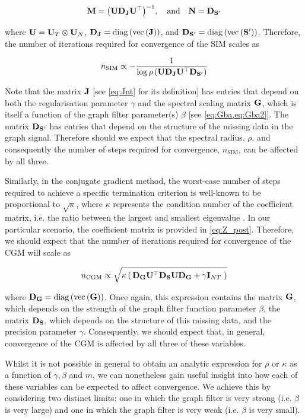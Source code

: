 $$
\mathbf{M} = \big(\mathbf{U} \mathbf{D}_{\mathbf{J}} \mathbf{U}^\top\big)^{-1}, \quad \text{and} \quad \mathbf{N} = \mathbf{D}_{\mathbf{S}'}
$$

where  $\mathbf{U} = \mathbf{U}_T \otimes \mathbf{U}_N$, $\mathbf{D}_{\mathbf{J}} = \text{\textup{diag}}\left(\text{\textup{vec}}\left(\mathbf{J}\right)\right)$, and $\mathbf{D}_{\mathbf{S}'} = \text{\textup{diag}}\left(\text{\textup{vec}}\left(\mathbf{S}'\right)\right)$. Therefore, the number of iterations required for convergence of the SIM scales as


\begin{equation}
    \label{eq:n_SIM}
    n_\text{SIM} \propto  -\frac{1}{\log\rho\left(\mathbf{U} \mathbf{D}_{\mathbf{J}} \mathbf{U}^\top \mathbf{D}_{\mathbf{S}'} \right)}
\end{equation}

Note that the matrix $\mathbf{J}$ [see \cref{eq:Jnt} for its definition] has entries that depend on both the regularisation parameter $\gamma$ and the spectral scaling matrix $\mathbf{G}$, which is itself a function of the graph filter parameter(s) $\beta$ [see \cref{eq:Gba,eq:Gba2}]. The matrix $\mathbf{D}_{\mathbf{S}'}$ has entries that depend on the structure of the missing data in the graph signal. Therefore should we expect that the spectral radius, $\rho$, and consequently the number of steps required for convergence, $n_\text{SIM}$, can be affected by all three.  

Similarly, in the conjugate gradient method, the worst-case number of steps required to achieve a specific termination criterion is well-known to be proportional to $\sqrt{\kappa}$, where $\kappa$ represents the condition number of the coefficient matrix, i.e. the ratio between the largest and smallest eigenvalue \cite{Kelley1995}. In our particular scenario, the coefficient matrix is provided in \cref{eq:Z_post}. Therefore, we should expect that the number of iterations required for convergence of the CGM will scale as

\begin{equation}
    \label{eq:n_CGM}
     n_\text{CGM} \propto \sqrt{\kappa \left(  \, \mathbf{D}_{\mathbf{G}} \mathbf{U}^\top \mathbf{D}_{\mathbf{S}} \mathbf{U} \mathbf{D}_{\mathbf{G}} + \gamma \mathbf{I}_{NT} \; \right)}
\end{equation}

where $\mathbf{D}_{\mathbf{G}} = \text{\textup{diag}}\left(\text{\textup{vec}}\left(\mathbf{G}\right)\right)$. Once again, this expression contains the matrix $\mathbf{G}$, which depends on the strength of the graph filter function parameter $\beta$, the matrix $\mathbf{D}_{\mathbf{S}}$, which depends on the structure of this missing data, and the precision parameter $\gamma$. Consequently, we should expect that, in general, convergence of the CGM is affected by all three of these variables. 

Whilst it is not possible in general to obtain an analytic expression for $\rho$ or $\kappa$ as a function of $\gamma, \beta$ and $m$, we can nonetheless gain useful insight into how each of these variables can be expected to affect convergence. We achieve this by considering two distinct limits: one in which the graph filter is very strong (i.e. $\beta$ is very large) and one in which the graph filter is very weak (i.e. $\beta$ is very small). 

